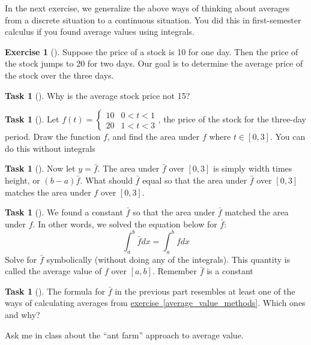 \documentclass[10pt,]{book}
\theoremstyle{plain}
\theoremstyle{definition}
\theoremstyle{definition}
\theoremstyle{definition}
\theoremstyle{definition}
\newtheorem{exploration}[project]{Exercise}
\newtheorem{task}[project]{Task}
\theoremstyle{definition}
\numberwithin{equation}{section}
\newcommand{\lt}{<}
\newcommand{\amp}{&}
\begin{document}
In the next exercise, we generalize the above ways of thinking about averages from a discrete situation to a continuous situation. You did this in first-semester calculus if you found average values using integrals.%
\begin{exploration}[]\label{exploration-213}
Suppose the price of a stock is \textdollar{}10 for one day. Then the price of the stock jumps to \textdollar{}20 for two days. Our goal is to determine the average price of the stock over the three days.%
\begin{task}[]\label{task-543}
Why is the average stock price not \textdollar{}15?%
\end{task}
\begin{task}[]\label{task-544}
Let \(f(t) = \begin{cases}10 \amp 0\lt t\lt 1\\20\amp 1\lt t\lt 3
\end{cases}\), the price of the stock for the three-day period. Draw the function \(f\), and find the area under \(f\) where \(t\in[0,3]\). You can do this without integrals%
%
\end{task}
\begin{task}[]\label{task-545}
Now let \(y=\bar f\).  The area under \(\bar f\) over \([0,3]\) is simply width times height, or \((b-a)\bar f\). What should \(\bar f\) equal so that the area under \(\bar f\) over \([0,3]\) matches the area under \(f\) over \([0,3]\).%
\end{task}
\begin{task}[]\label{task-546}
We found a constant \(\bar f\) so that the area under \(\bar f\) matched the area under \(f\). In other words, we solved the equation below for \(\bar f\):%
\begin{equation*}
\int_a^b \bar f dx = \int_a^b f dx
\end{equation*}
Solve for \(\bar f\) symbolically (without doing any of the integrals). This quantity is called the average value of \(f\) over \([a,b]\). Remember \(\bar{f}\) is a constant%
%
\end{task}
\begin{task}[]\label{task-547}
The formula for \(\bar f\) in the previous part resembles at least one of the ways of calculating averages from \hyperref[average_value_methods]{exercise~\ref{average_value_methods}}.  Which ones and why?%
\end{task}
\end{exploration}
Ask me in class about the ``ant farm'' approach to average value.%
\end{document}
